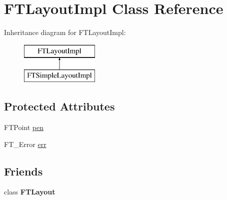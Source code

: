 \hypertarget{class_f_t_layout_impl}{
\section{FTLayoutImpl Class Reference}
\label{class_f_t_layout_impl}
}
Inheritance diagram for FTLayoutImpl:\begin{figure}[H]
\begin{center}
\leavevmode
\includegraphics[height=2.000000cm]{class_f_t_layout_impl}
\end{center}
\end{figure}
\subsection*{Protected Attributes}
\begin{DoxyCompactItemize}
\item 
FTPoint \hyperlink{class_f_t_layout_impl_aefaff875c0cf4fe5710897f614be44ac}{pen}
\item 
FT\_\-Error \hyperlink{class_f_t_layout_impl_af3c9ad6d6636a69a6643d68383e4edcd}{err}
\end{DoxyCompactItemize}
\subsection*{Friends}
\begin{DoxyCompactItemize}
\item 
\hypertarget{class_f_t_layout_impl_a28e6cd087379e90923b29b9c2c103aa8}{
class {\bfseries FTLayout}}
\label{class_f_t_layout_impl_a28e6cd087379e90923b29b9c2c103aa8}

\end{DoxyCompactItemize}


